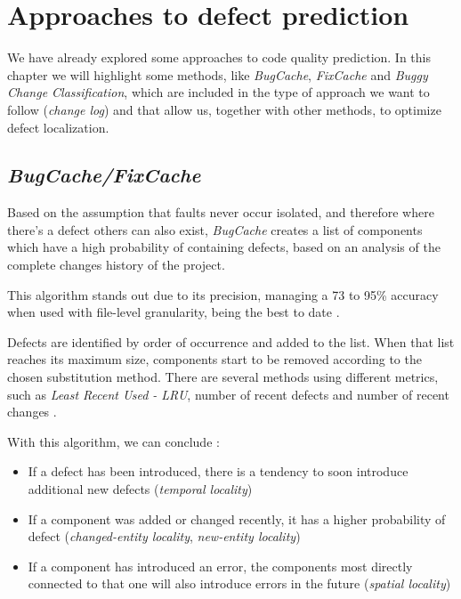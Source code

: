 \section{Approaches to defect prediction}

We have already explored some approaches to code quality prediction. In this chapter we will highlight some methods, like \emph{BugCache}, \emph{FixCache} and \emph{Buggy Change Classification}, which are included in the type of approach we want to follow (\emph{change log}) and that allow us, together with other methods, to optimize defect localization.

\subsection{\emph{BugCache/FixCache}}

Based on the assumption that faults never occur isolated, and therefore where there's a defect others can also exist, \emph{BugCache} creates a list of components which have a high probability of containing defects, based on an analysis of the complete changes history of the project.

This algorithm stands out due to its precision, managing a 73 to 95\% accuracy when used with file-level granularity, being the best to date \cite{kim2006automatic}.

Defects are identified by order of occurrence and added to the list. When that list reaches its maximum size, components start to be removed according to the chosen substitution method. There are several methods using different metrics, such as \emph{Least Recent Used - LRU}, number of recent defects and number of recent changes \cite{kim2006automatic}.

With this algorithm, we can conclude \cite{kim2006automatic}:
%
\begin{itemize}
	\item If a defect has been introduced, there is a tendency to soon introduce additional new defects (\emph{temporal locality})
	\item If a component was added or changed recently, it has a higher probability of defect (\emph{changed-entity locality}, \emph{new-entity locality})
	\item If a component has introduced an error, the components most directly connected to that one will also introduce errors in the future (\emph{spatial locality})
\end{itemize}

